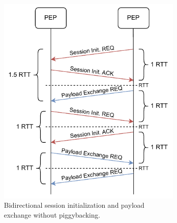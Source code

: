 \begin{description}
\begin{figure}
\begin{subfigure}[t]{0.48\linewidth}
            \includegraphics[width=\linewidth]{figures/SABAAC_protocols_accesscontrol_initialization_rtt_nopiggyback.drawio.pdf}
            \caption{Bidirectional session initialization and payload exchange without piggybacking.}
            \label{fig:sabaac_accesscontrol_initialization_rtt_nopiggyback}
        \end{subfigure}
        \hfill
        \begin{subfigure}[t]{0.48\linewidth}
            \centering

\end{subfigure}
\end{figure}
\end{description}
